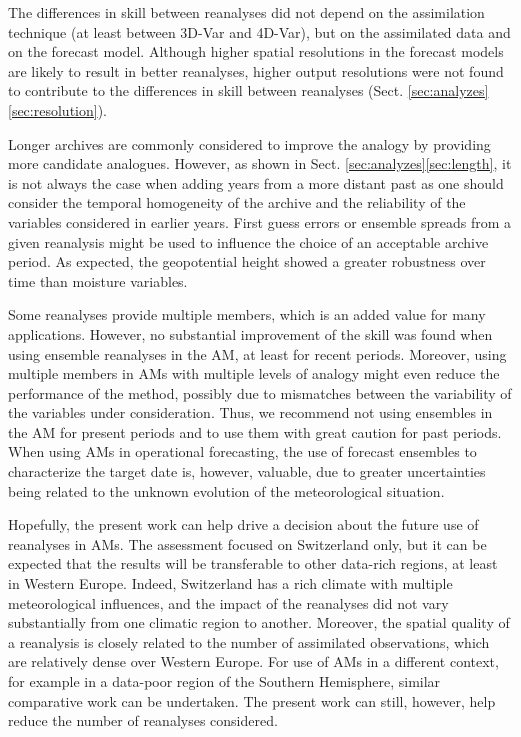 \documentclass{ametsoc}
\begin{document}
	The differences in skill between reanalyses did not depend on the assimilation technique (at least between 3D-Var and 4D-Var), but on the assimilated data and on the forecast model. Although higher spatial resolutions in the forecast models are likely to result in better reanalyses, higher output resolutions were not found to contribute to the differences in skill between reanalyses (Sect. \ref{sec:analyzes}\ref{sec:resolution}). 
	
	Longer archives are commonly considered to improve the analogy by providing more candidate analogues. However, as shown in Sect. \ref{sec:analyzes}\ref{sec:length}, it is not always the case when adding years from a more distant past as one should consider the temporal homogeneity of the archive and the reliability of the variables considered in earlier years. First guess errors or ensemble spreads from a given reanalysis might be used to influence the choice of an acceptable archive period. As expected, the geopotential height showed a greater robustness over time than moisture variables. 
	
	Some reanalyses provide multiple members, which is an added value for many applications. However, no substantial improvement of the skill was found when using ensemble reanalyses in the AM, at least for recent periods. Moreover, using multiple members in AMs with multiple levels of analogy might even reduce the performance of the method, possibly due to mismatches between the variability of the variables under consideration. Thus, we recommend not using ensembles in the AM for present periods and to use them with great caution for past periods. When using AMs in operational forecasting, the use of forecast ensembles to characterize the target date is, however, valuable, due to greater uncertainties being related to the unknown evolution of the meteorological situation.
	
	Hopefully, the present work can help drive a decision about the future use of reanalyses in AMs. The assessment focused on Switzerland only, but it can be expected that the results will be transferable to other data-rich regions, at least in Western Europe. Indeed, Switzerland has a rich climate with multiple meteorological influences, and the impact of the reanalyses did not vary substantially from one climatic region to another. Moreover, the spatial quality of a reanalysis is closely related to the number of assimilated observations, which are relatively dense over Western Europe. For use of AMs in a different context, for example in a data-poor region of the Southern Hemisphere, similar comparative work can be undertaken. The present work can still, however, help reduce the number of reanalyses considered.
	
\end{document}
